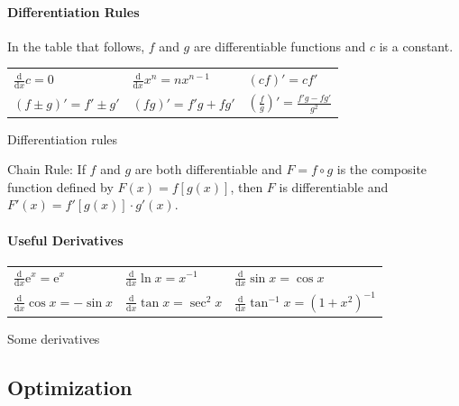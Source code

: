 \documentclass[captions=tableheading]{scrbook}
\begin{document}
\paragraph*{Differentiation Rules}
In the table that follows, \(f\) and \(g\) are differentiable functions and \(c\) is a constant.

\begin{center}
\begin{tabular}{lll}
 \(\frac{\mathrm{d}}{\mathrm{d} x}c=0\)  &  \(\frac{\mathrm{d}}{\mathrm{d} x}x^{n}=nx^{n-1}\)  &  \((cf)'=cf'\)                                        \\
 \((f\pm g)'=f'\pm g'\)                  &  \((fg)'=f'g+fg'\)                                  &  \(\left(\frac{f}{g}\right)'=\frac{f'g-fg'}{g^{2}}\)  \\
\end{tabular}
\end{center}


\caption{Differentiation rules\textbf{\label{tab:Differentiation-Rules}}}

\begin{thm}
Chain Rule: If \(f\) and \(g\) are both differentiable and \(F=f\circ g\) is the composite function defined by \(F(x)=f[g(x)]\), then \(F\) is differentiable and \(F'(x) = f'[ g(x) ] \cdot g'(x)\).  
\end{thm}

\paragraph*{Useful Derivatives}


\begin{center}
\begin{tabular}{lll}
 \(\frac{\mathrm{d}}{\mathrm{d} x}\mathrm{e}^{x}=\mathrm{e}^{x}\)  &  \(\frac{\mathrm{d}}{\mathrm{d} x}\ln x=x^{-1}\)      &  \(\frac{\mathrm{d}}{\mathrm{d} x}\sin x=\cos x\)              \\
 \(\frac{\mathrm{d}}{\mathrm{d} x}\cos x=-\sin x\)                 &  \(\frac{\mathrm{d}}{\mathrm{d} x}\tan x=\sec^{2}x\)  &  \(\frac{\mathrm{d}}{\mathrm{d} x}\tan^{-1}x=(1+x^{2})^{-1}\)  \\
\end{tabular}
\end{center}


\caption{Some derivatives\label{tab:Useful-Derivatives}}
\subsection{Optimization}
\label{sec-21-2-3}
\end{document}
